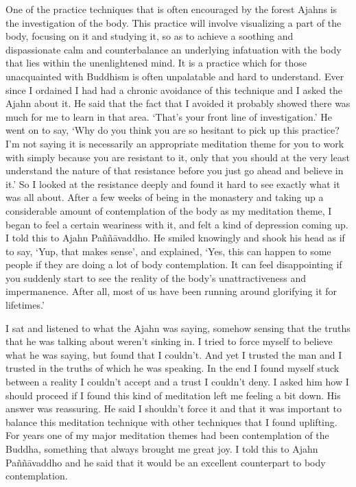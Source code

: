 One of the practice techniques that is often encouraged by the forest
Ajahns is the investigation of the body. This practice will involve
visualizing a part of the body, focusing on it and studying it, so as to
achieve a soothing and dispassionate calm and counterbalance an
underlying infatuation with the body that lies within the unenlightened
mind. It is a practice which for those unacquainted with Buddhism is
often unpalatable and hard to understand. Ever since I ordained I had
had a chronic avoidance of this technique and I asked the Ajahn about
it. He said that the fact that I avoided it probably showed there was
much for me to learn in that area. `That's your front line of
investigation.' He went on to say, `Why do you think you are so hesitant
to pick up this practice? I'm not saying it is necessarily an
appropriate meditation theme for you to work with simply because you are
resistant to it, only that you should at the very least understand the
nature of that resistance before you just go ahead and believe in it.'
So I looked at the resistance deeply and found it hard to see exactly
what it was all about. After a few weeks of being in the monastery and
taking up a considerable amount of contemplation of the body as my
meditation theme, I began to feel a certain weariness with it, and felt
a kind of depression coming up. I told this to Ajahn Paññāvaddho. He
smiled knowingly and shook his head as if to say, `Yup, that makes
sense', and explained, `Yes, this can happen to some people if they are
doing a lot of body contemplation. It can feel disappointing if you
suddenly start to see the reality of the body's unattractiveness and
impermanence. After all, most of us have been running around glorifying
it for lifetimes.'

I sat and listened to what the Ajahn was saying, somehow sensing that
the truths that he was talking about weren't sinking in. I tried to
force myself to believe what he was saying, but found that I couldn't.
And yet I trusted the man and I trusted in the truths of which he was
speaking. In the end I found myself stuck between a reality I couldn't
accept and a trust I couldn't deny. I asked him how I should proceed if
I found this kind of meditation left me feeling a bit down. His answer
was reassuring. He said I shouldn't force it and that it was important
to balance this meditation technique with other techniques that I found
uplifting. For years one of my major meditation themes had been
contemplation of the Buddha, something that always brought me great joy.
I told this to Ajahn Paññāvaddho and he said that it would be an
excellent counterpart to body contemplation.

